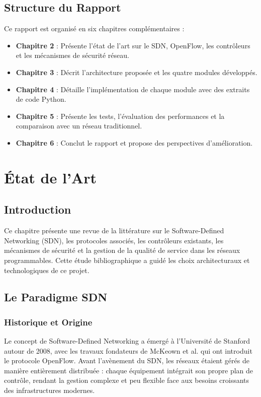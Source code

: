 \documentclass[12pt,a4paper]{report}
\begin{document}
\section{Structure du Rapport}
Ce rapport est organisé en six chapitres complémentaires :
\begin{itemize}
    \item \textbf{Chapitre 2} : Présente l'état de l'art
    sur le SDN, OpenFlow, les contrôleurs et les mécanismes
    de sécurité réseau.
    \item \textbf{Chapitre 3} : Décrit l'architecture
    proposée et les quatre modules développés.
    \item \textbf{Chapitre 4} : Détaille l'implémentation
    de chaque module avec des extraits de code Python.
    \item \textbf{Chapitre 5} : Présente les tests,
    l'évaluation des performances et la comparaison avec
    un réseau traditionnel.
    \item \textbf{Chapitre 6} : Conclut le rapport et
    propose des perspectives d'amélioration.
\end{itemize}
\newpage

\chapter{État de l'Art}

\section{Introduction}
Ce chapitre présente une revue de la littérature sur le
Software-Defined Networking (SDN), les protocoles associés,
les contrôleurs existants, les mécanismes de sécurité et
la gestion de la qualité de service dans les réseaux
programmables. Cette étude bibliographique a guidé les
choix architecturaux et technologiques de ce projet.

\section{Le Paradigme SDN}

\subsection{Historique et Origine}
Le concept de Software-Defined Networking a émergé à
l'Université de Stanford autour de 2008, avec les travaux
fondateurs de McKeown et al. \cite{mckeown2008openflow}
qui ont introduit le protocole OpenFlow. Avant l'avènement
du SDN, les réseaux étaient gérés de manière entièrement
distribuée : chaque équipement intégrait son propre plan
de contrôle, rendant la gestion complexe et peu flexible
face aux besoins croissants des infrastructures modernes.
\end{document}
